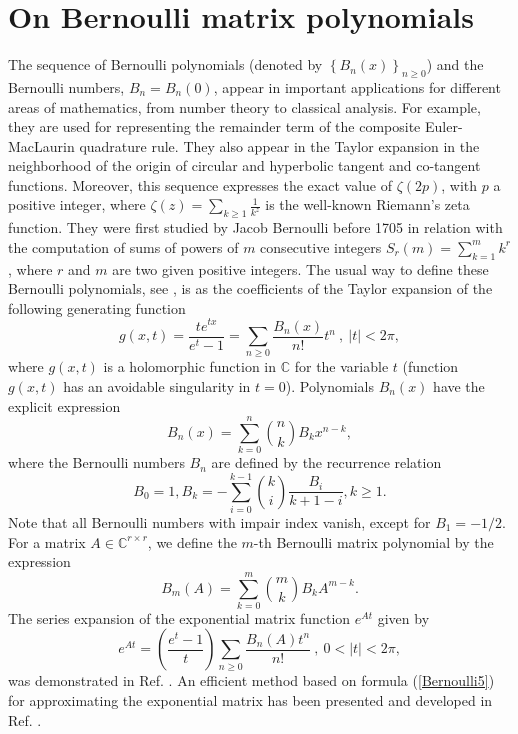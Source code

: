 \section{On Bernoulli matrix polynomials}\label{section2}
The sequence of Bernoulli polynomials (denoted by $\left\{B_n(x)\right\}_{n \geq 0}$) and the Bernoulli numbers, $B_n=B_{n}(0)$, appear in important applications for different areas of mathematics, from number theory to classical analysis. For example, they are used for
representing the remainder term of the composite Euler-MacLaurin quadrature rule. They also appear in the Taylor expansion in the neighborhood of the origin of circular and
hyperbolic tangent and co-tangent functions. Moreover, this sequence expresses the exact value of $\zeta(2p)$, with $p$ a positive integer, where $\zeta(z)=\displaystyle \sum_{k \geq 1} \frac{1}{k^{z}}$ is the
well-known Riemann's zeta function. They were first studied by Jacob Bernoulli before 1705 in relation with the computation of sums of
powers of $m$ consecutive integers $\displaystyle S_r(m)=\sum_{k=1}^{m} k^r$, where $r$ and $m$ are two given positive integers. The usual way to define these Bernoulli
polynomials, see \cite[p.~588]{olver2010nist} , is as the coefficients of the Taylor expansion of the following generating function
\begin{equation}\label{Bernoulli1}
g(x, t)= \frac{t e^{tx}}{e^t-1}=\sum_{n \geq 0} \frac{B_n(x)}{n!}t^n  \ , \ |t|<2\pi,
\end{equation}
where $g(x, t)$ is a holomorphic function in $\mathbb{C}$ for the variable $t$ (function $g(x, t)$ has an avoidable singularity in $t=0$). Polynomials $B_n(x)$ have the explicit expression
\begin{equation}\label{Bernoulli2}
B_n(x)=\sum_{k=0}^{n} {n \choose k} B_k x^{n-k},
\end{equation}
where the Bernoulli numbers $B_n$ are defined by the recurrence relation
\begin{equation}\label{Bernoulli3}
B_0=1, \displaystyle  B_{k}= -\sum_{i=0}^{k-1} {k \choose i} \frac{B_i}{k+1-i}, k \geq 1.
\end{equation}
Note that all Bernoulli numbers with impair index vanish, except for $B_{1}=-1/2$. For a matrix $A \in \mathbb{C}^{r \times r}$, we define the $m$-th Bernoulli matrix polynomial by the expression
\begin{equation}\label{Bernoulli4}
B_m(A)=\sum_{k=0}^{m} {m \choose k} B_k A^{m-k}.
\end{equation}
The series expansion of the exponential matrix function $e^{At}$ given by
\begin{equation}\label{Bernoulli5}
e^{At} = \left(\frac{e^t-1}{t}\right)\sum_{n \geq 0} \frac{ B_n(A) t^{n}}{n!} \ , \ 0<|t|<2\pi,
\end{equation}
was demonstrated in Ref. \cite{defez2019}. An efficient method based on formula (\ref{Bernoulli5}) for approximating the exponential matrix has been presented and developed in Ref. \cite{defez2019}.\\

